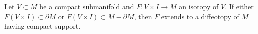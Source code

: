 Let $V \subset M$ be a compact submanifold and $F: V \times I \to M$ an isotopy of $V$. If either $F(V \times I) \subset \partial M$ or $F(V \times I) \subset M - \partial M$, then $F$ extends to a diffeotopy of $M$ having compact support.
